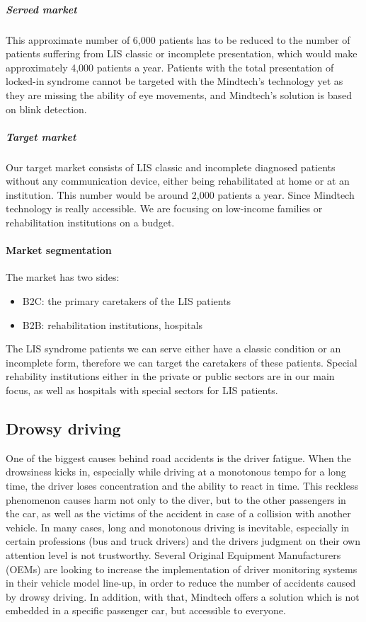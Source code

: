 \documentclass[letterpaper,10pt]{article}
\let\oldsubsection\subsection
\renewcommand{\subsection}{\def\cursectioning{subsection}\oldsubsection}
\begin{document}
\subparagraph{Served market} This approximate number of 6,000 patients has to be reduced to the number of patients suffering from LIS classic or incomplete presentation, which would make approximately 4,000 patients a year. Patients with the total presentation of locked-in syndrome cannot be targeted with the Mindtech's technology yet as they are missing the ability of eye movements, and Mindtech's solution is based on blink detection.

\subparagraph{Target market} Our target market consists of LIS classic and incomplete diagnosed patients without any communication device, either being rehabilitated at home or at an institution. This number would be around 2,000 patients a year. Since Mindtech technology is really accessible. We are focusing on low-income families or rehabilitation institutions on a budget.

\paragraph{Market segmentation}

The market has two sides:
\begin{itemize}
\item B2C: the primary caretakers of the LIS patients
\item B2B: rehabilitation institutions, hospitals
\end{itemize}  

The LIS syndrome patients we can serve either have a classic condition  or an incomplete form, therefore we can target the caretakers of these patients. Special rehability institutions either in the private or public sectors are in our main focus, as well as hospitals with special sectors for LIS patients.


\subsection{Drowsy driving}

One of the biggest causes behind road accidents is the driver fatigue. When the drowsiness kicks in, especially while driving at a monotonous tempo for a long time, the driver loses concentration and the ability to react in time. This reckless phenomenon causes harm not only to the diver, but to the other passengers in the car, as well as the victims of the accident in case of a collision with another vehicle. In many cases, long and monotonous driving is inevitable, especially in certain professions (bus and truck drivers) and the drivers judgment on their own attention level is not trustworthy.
Several Original Equipment Manufacturers (OEMs) are looking to increase the implementation of driver monitoring systems in their vehicle model line-up, in order to reduce the number of accidents caused by drowsy driving. In addition, with that, Mindtech offers a solution which is not embedded in a specific passenger car, but accessible to everyone.
\cite{luxury}
\end{document}
